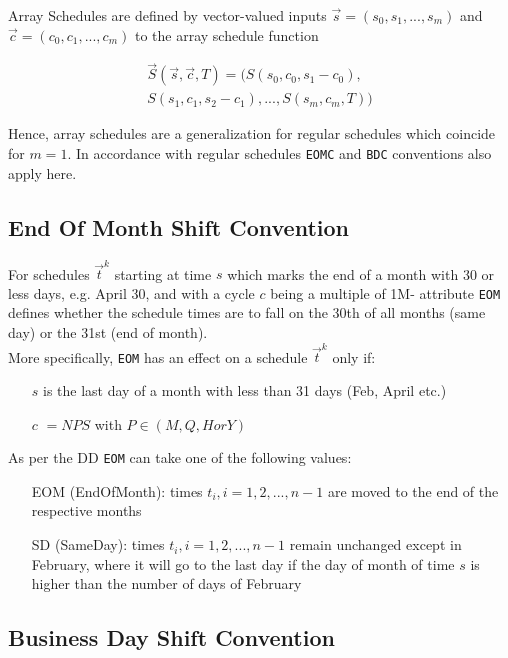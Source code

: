 \documentclass[9pt,oneside]{amsart}
\newcommand{\attr}[1]{\texttt{#1}}
\newcommand{\sdl}[3]{S(#1,#2,#3)}
\newcommand{\vsdl}[3]{\vec{S}(#1,#2,#3)}
\begin{document}
\begin{multicols}{2}
Array Schedules are defined by vector-valued inputs $\vec{s}=(s_0,s_1,...,s_m)$ and $\vec{c}=(c_0,c_1,...,c_m)$ to the array schedule function

\begin{multline*}
	\vsdl{\vec{s}}{\vec{c}}{T} = (\sdl{s_0}{c_0}{s_1-c_0},\\
					\sdl{s_1}{c_1}{s_2-c_1},...,\sdl{s_m}{c_m}{T})
\end{multline*}


Hence, array schedules are a generalization for regular schedules which coincide for $m=1$. In accordance with regular schedules \attr{EOMC} and \attr{BDC} conventions also apply here.


\subsection{End Of Month Shift Convention}\label{sec:eomc}

For schedules $\vec{t}^k$ starting at time $s$ which marks the end of a month with 30 or less days, e.g. April 30, and with a cycle $c$ being a multiple of 1M- attribute \attr{EOM} defines whether the schedule times are to fall on the 30th of all months (same day) or the 31st (end of month).\\

More specifically, \attr{EOM} has an effect on a schedule $\vec{t}^k$ only if:

\begin{itemize}
	\item[$s$] is the last day of a month with less than 31 days (Feb, April etc.)

	\item[$c$] $=NPS$ with $P\in(M, Q, H or Y)$
\end{itemize}

As per the DD \attr{EOM} can take one of the following values:
\begin{itemize}
	\item[EOM] (EndOfMonth): times $t_i,i=1,2,...,n-1$ are moved to the end of the respective months

	\item[SD] (SameDay): times $t_i,i=1,2,...,n-1$ remain unchanged except in February, where it will go to the last day if the day of month of time $s$ is higher than the number of days of February
\end{itemize}


\subsection{Business Day Shift Convention}\label{sec:bdc}


\end{multicols}
\end{document}
